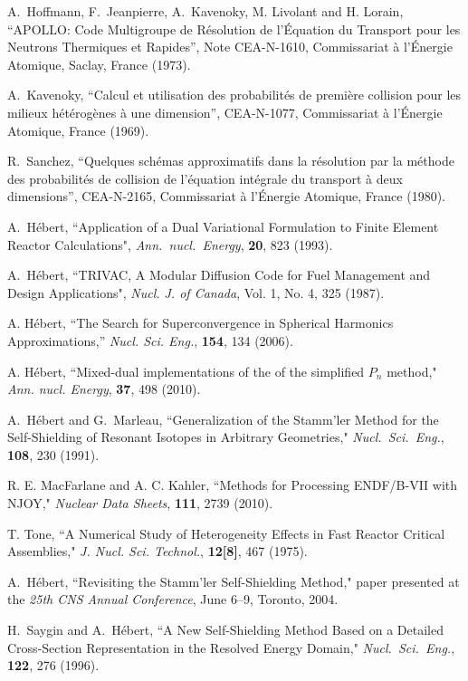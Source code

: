 \begin{thebibliography}{99}
A.~Hoffmann, F.~Jeanpierre, A.~Kavenoky, M. Livolant and H. Lorain,
``APOLLO: Code Multigroupe de R\'esolution de l'\'Equation du Transport
pour les Neutrons Thermiques et Rapides'', Note CEA-N-1610, Commissariat
\`a l'\'Energie Atomique, Saclay, France (1973).

A.~Kavenoky, ``Calcul et utilisation des probabilit\'es de premi\`ere collision
pour les milieux h\'et\'erog\`enes \`a  une dimension'', CEA-N-1077,
Commissariat \`a l'\'Energie Atomique, France (1969).

R.~Sanchez, ``Quelques sch\'emas approximatifs dans la r\'esolution
par la m\'ethode des probabilit\'es de collision de l'\'equation
int\'egrale du transport \`a deux dimensions'', CEA-N-2165,
Commissariat \`a l'\'Energie Atomique, France (1980).

A.~H\'ebert, ``Application of a Dual Variational Formulation to Finite Element
Reactor Calculations", {\sl Ann.~nucl.~Energy}, {\bf 20}, 823 (1993).

A.~H\'ebert, ``TRIVAC, A Modular Diffusion Code for Fuel Management and Design
Applications", {\sl Nucl. J. of Canada}, Vol. 1, No. 4, 325 (1987).

A. H\'ebert, ``The Search for Superconvergence in Spherical Harmonics Approximations,'' {\sl Nucl. Sci. Eng.}, {\bf 154}, 134 (2006).

A. H\'ebert, ``Mixed-dual implementations of the of the simplified $P_n$ method," {\sl Ann. nucl. Energy}, {\bf 37}, 498 (2010).

A.~H\'ebert and G.~Marleau, ``Generalization of the Stamm'ler Method for the
Self-Shielding of Resonant Isotopes in Arbitrary Geometries," {\sl
Nucl.~Sci.~Eng.}, {\bf 108}, 230 (1991).

R. E. MacFarlane and A. C. Kahler, ``Methods for Processing ENDF/B-VII with NJOY," {\sl Nuclear Data Sheets}, {\bf 111}, 2739 (2010).

T. Tone, ``A Numerical Study of Heterogeneity Effects in Fast Reactor Critical Assemblies," {\sl J. Nucl. Sci. Technol.}, {\bf 12[8]}, 467 (1975).

A.~H\'ebert, ``Revisiting the Stamm'ler Self-Shielding Method," paper presented at the
\textsl{25th CNS Annual Conference}, June 6--9, Toronto, 2004.

H.~Saygin and  A.~H\'ebert, ``A New Self-Shielding Method Based on a Detailed
Cross-Section Representation in the Resolved Energy Domain,"
{\sl Nucl.~Sci.~Eng.}, {\bf 122}, 276 (1996).


\end{thebibliography}

